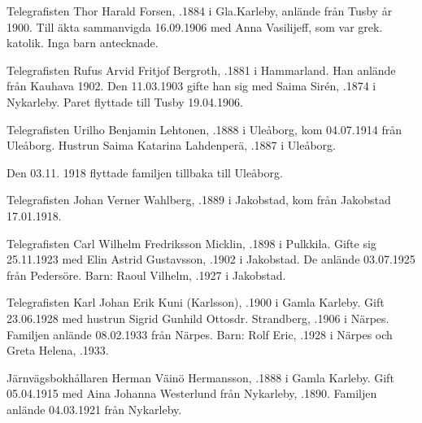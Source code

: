 Telegrafisten Thor Harald Forsen, .1884 i Gla.Karleby, anlände från Tusby år 1900. Till äkta sammanvigda 16.09.1906 med Anna Vasilijeff, som var grek. katolik. Inga barn antecknade.


Telegrafisten Rufus Arvid Fritjof Bergroth, .1881 i Hammarland. Han anlände från Kauhava 1902. Den 11.03.1903 gifte han sig med Saima Sirén, .1874 i Nykarleby. Paret flyttade till Tusby 19.04.1906.


Telegrafisten Urilho Benjamin Lehtonen, .1888 i Uleåborg, kom 04.07.1914 från Uleåborg. Hustrun Saima Katarina Lahdenperä, .1887 i Uleåborg.
\begin{jhchildren}
  \item {}
  \item {}
  \item {}
  \item {}
\end{jhchildren}
Den 03.11. 1918 flyttade familjen tillbaka till Uleåborg.


Telegrafisten Johan Verner Wahlberg, .1889 i Jakobstad, kom från Jakobstad 17.01.1918.


Telegrafisten Carl Wilhelm Fredriksson Micklin, .1898 i Pulkkila. Gifte sig 25.11.1923 med Elin Astrid Gustavsson, .1902 i Jakobstad. De anlände 03.07.1925 från Pedersöre.
Barn: Raoul Vilhelm, .1927 i Jakobstad.


Telegrafisten Karl Johan Erik Kuni (Karlsson), .1900 i Gamla Karleby. Gift 23.06.1928 med hustrun Sigrid Gunhild Ottosdr. Strandberg, .1906 i Närpes. Familjen anlände 08.02.1933 från Närpes.
Barn: Rolf Eric, .1928 i Närpes och Greta Helena, .1933.


Järnvägsbokhållaren Herman Väinö Hermansson, .1888 i Gamla Karleby. Gift 05.04.1915 med Aina Johanna Westerlund från Nykarleby, .1890. Familjen anlände 04.03.1921 från Nykarleby.
\begin{jhchildren}
  \item {}
  \item {}
  \item {}
\end{jhchildren}



